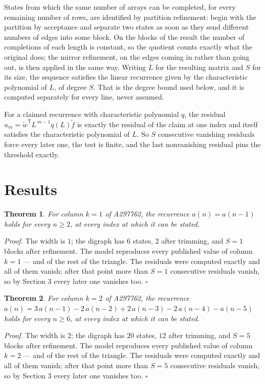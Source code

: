 \documentclass[11pt]{article}
\newtheorem{theorem}{Theorem}
\theoremstyle{definition}
\begin{document}
States from which the same number of arrays can be completed, for every remaining number of rows, are identified by partition refinement: begin with the partition by acceptance and separate two states as soon as they send different numbers of edges into some block. On the blocks of the result the number of completions of each length is constant, so the quotient counts exactly what the original does; the mirror refinement, on the edges coming in rather than going out, is then applied in the same way. Writing $L$ for the resulting matrix and $S$ for its size, the sequence satisfies the linear recurrence given by the characteristic polynomial of $L$, of degree $S$. That is the degree bound used below, and it is computed separately for every line, never assumed.

For a claimed recurrence with characteristic polynomial $q$, the residual $u_m = \tilde w^{\mathsf T}L^{\,m-1}q(L)\tilde f$ is exactly the residual of the claim at one index and itself satisfies the characteristic polynomial of $L$. So $S$ consecutive vanishing residuals force every later one, the test is finite, and the last nonvanishing residual pins the threshold exactly.

\section{Results}

\begin{theorem} For column $k = 1$ of A297762, the recurrence $a(n) = a(n-1)$ holds for every $n \ge 2$, at every index at which it can be stated.\end{theorem}

{\itshape Proof.} The width is $1$; the digraph has $6$ states, $2$ after trimming, and $S = 1$ blocks after refinement. The model reproduces every published value of column $k = 1$ --- and of the rest of the triangle. The residuals were computed exactly and all of them vanish; after that point more than $S = 1$ consecutive residuals vanish, so by Section 3 every later one vanishes too. $\square$

\begin{theorem} For column $k = 2$ of A297762, the recurrence $a(n) = 3\,a(n-1) - 2\,a(n-2) + 2\,a(n-3) - 2\,a(n-4) - a(n-5)$ holds for every $n \ge 6$, at every index at which it can be stated.\end{theorem}

{\itshape Proof.} The width is $2$; the digraph has $20$ states, $12$ after trimming, and $S = 5$ blocks after refinement. The model reproduces every published value of column $k = 2$ --- and of the rest of the triangle. The residuals were computed exactly and all of them vanish; after that point more than $S = 5$ consecutive residuals vanish, so by Section 3 every later one vanishes too. $\square$
\end{document}
